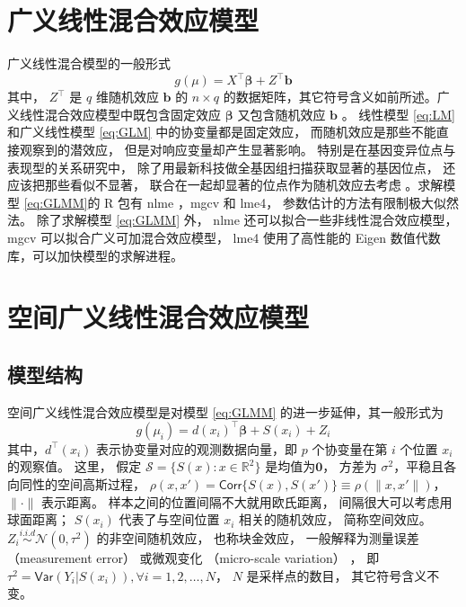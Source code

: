 \documentclass[12pt,a4paper,UTF8,twoside]{book}
\theoremstyle{definition}
\theoremstyle{definition}
\theoremstyle{definition}
\theoremstyle{remark}
\begin{document}
\hypertarget{sec:Generalized-Linear-Mixed-Effects-Models}{%
\section{广义线性混合效应模型}\label{sec:Generalized-Linear-Mixed-Effects-Models}}

广义线性混合模型的一般形式 \begin{equation}
g(\mu) = X^{\top}\boldsymbol{\beta} + Z^{\top}\mathbf{b}  \label{eq:GLMM}
\end{equation} \noindent 其中， \(Z^{\top}\) 是 \(q\) 维随机效应
\(\mathbf{b}\) 的 \(n \times q\)
的数据矩阵，其它符号含义如前所述。广义线性混合效应模型中既包含固定效应
\(\boldsymbol{\beta}\) 又包含随机效应 \(\mathbf{b}\) 。 线性模型
\eqref{eq:LM} 和广义线性模型 \eqref{eq:GLM} 中的协变量都是固定效应，
而随机效应是那些不能直接观察到的潜效应， 但是对响应变量却产生显著影响。
特别是在基因变异位点与表现型的关系研究中，
除了用最新科技做全基因组扫描获取显著的基因位点，
还应该把那些看似不显著， 联合在一起却显著的位点作为随机效应去考虑
\citep{Yang2010Common}。求解模型 \eqref{eq:GLMM}的 R 包有 nlme ，mgcv 和
lme4， 参数估计的方法有限制极大似然法。 除了求解模型 \eqref{eq:GLMM} 外，
nlme 还可以拟合一些非线性混合效应模型， mgcv
可以拟合广义可加混合效应模型， lme4 使用了高性能的 Eigen
数值代数库，可以加快模型的求解进程。

\hypertarget{sec:Spatial-Generalized-linear-mixed-effects-models}{%
\section{空间广义线性混合效应模型}\label{sec:Spatial-Generalized-linear-mixed-effects-models}}

\hypertarget{subsec:structure-sglmm}{%
\subsection{模型结构}\label{subsec:structure-sglmm}}

空间广义线性混合效应模型是对模型 \eqref{eq:GLMM}
的进一步延伸，其一般形式为 \begin{equation}
g(\mu_i) = d(x_i)^{\top}\boldsymbol{\beta} + S(x_i) + Z_i \label{eq:SGLMM}
\end{equation} \noindent 其中，\(d^{\top}(x_i)\)
表示协变量对应的观测数据向量，即 \(p\) 个协变量在第 \(i\) 个位置 \(x_i\)
的观察值。 这里， 假定 \(\mathcal{S} = \{S(x): x \in \mathbb{R}^2\}\)
是均值为\(\mathbf{0}\)， 方差为
\(\sigma^2\)，平稳且各向同性的空间高斯过程，
\(\rho(x,x') = \mathsf{Corr}\{S(x),S(x')\} \equiv \rho(\|x,x'\|)\)，
\(\|\cdot\|\) 表示距离。 样本之间的位置间隔不大就用欧氏距离，
间隔很大可以考虑用球面距离； \(S(x_i)\) 代表了与空间位置 \(x_i\)
相关的随机效应， 简称空间效应。
\(Z_i \stackrel{i.i.d}{\sim} \mathcal{N}(0,\tau^2)\) 的非空间随机效应，
也称块金效应， 一般解释为测量误差 （measurement error） 或微观变化
（micro-scale variation） \citep{Christensen2004}， 即
\(\tau^2=\mathsf{Var}(Y_{i}|S(x_{i})),\forall i = 1,2, \ldots, N\)，
\(N\) 是采样点的数目， 其它符号含义不变。
\end{document}
